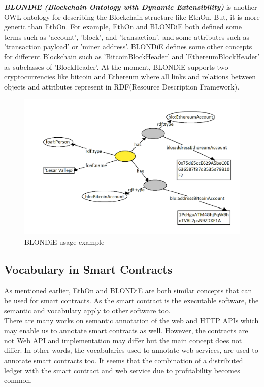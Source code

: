 \textbf{\textit{BLONDiE (Blockchain Ontology with Dynamic Extensibility)}} is another OWL ontology for describing the Blockchain structure like EthOn. But, it is more generic than EthOn. For example, EthOn and BLONDiE both defined some terms such as 'account', 'block', and 'transaction', and some attributes such as 'transaction payload' or 'miner address'. BLONDiE defines some other concepts for different Blockchain such as 'BitcoinBlockHeader' and 'EthereumBlockHeader' as subclasses of 'BlockHeader'. At the moment, BLONDiE supports two cryptocurrencies like bitcoin and Ethereum where all links and relations between objects and attributes represent in RDF(Resource Description Framework)\cite{Third}.
\begin{center}
	\begin{figure}[htb!]
		
		\begin{minipage}{0.55\linewidth}
			\centering
			\includegraphics[width=1.75\textwidth]{images/chap02_BLONDiE.png}
		\end{minipage}
		\caption[BLONDiE]{BLONDiE usage example\cite{Hector}}
		
		
	\end{figure}
	
\end{center}
\subsection{Vocabulary in Smart Contracts}
As mentioned earlier, EthOn and BLONDiE are both similar concepts that can be used for smart contracts. As the smart contract is the executable software, the semantic and vocabulary apply to other software too.\\
There are many works on semantic annotation of the web and HTTP APIs which may enable us to annotate smart contracts as well. However, the contracts are not Web API and implementation may differ but the main concept does not differ. In other words, the vocabularies used to annotate web services, are used to annotate smart contracts too. It seems that the combination of a distributed ledger with the smart contract and web service due to profitability becomes common\cite{Third}.

